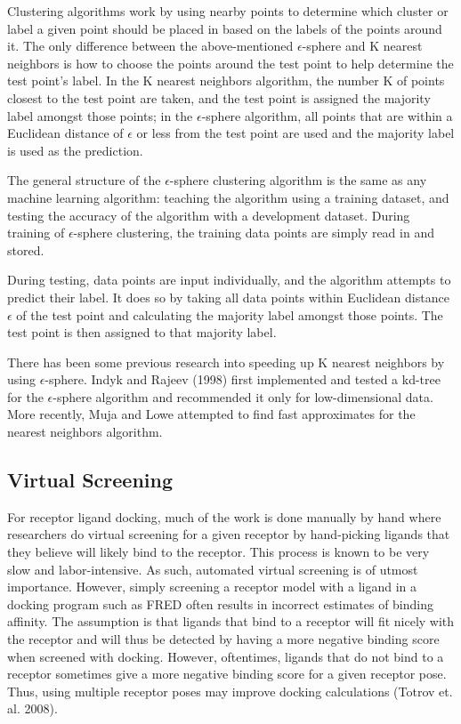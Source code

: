 \documentclass[11pt,letterpaper]{article}
\begin{document}
Clustering algorithms work by using nearby points to determine which cluster or label a given point should be placed in based on the labels of the points around it. The only difference between the above-mentioned $\epsilon$-sphere and K nearest neighbors is how to choose the points around the test point to help determine the test point's label. In the K nearest neighbors algorithm, the number K of points closest to the test point are taken, and the test point is assigned the majority label amongst those points; in the $\epsilon$-sphere algorithm, all points that are within a Euclidean distance of $\epsilon$ or less from the test point are used and the majority label is used as the prediction.

The general structure of the $\epsilon$-sphere clustering algorithm is the same as any machine learning algorithm: teaching the algorithm using a training dataset, and testing the accuracy of the algorithm with a development dataset. During training of $\epsilon$-sphere clustering, the training data points are simply read in and stored. 

During testing, data points are input individually, and the algorithm attempts to predict their label. It does so by taking all data points within Euclidean distance $\epsilon$ of the test point and calculating the majority label amongst those points. The test point is then assigned to that majority label.

There has been some previous research into speeding up K nearest neighbors by using $\epsilon$-sphere. Indyk and Rajeev (1998) first implemented and tested a kd-tree for the $\epsilon$-sphere algorithm and recommended it only for low-dimensional data. More recently, Muja and Lowe attempted to find fast approximates for the nearest neighbors algorithm.

\subsection{Virtual Screening}
For receptor ligand docking, much of the work is done manually by hand where researchers do virtual screening for a given receptor by hand-picking ligands that they believe will likely bind to the receptor.  This process is known to be very slow and labor-intensive.  As such, automated virtual screening is of utmost importance.  However, simply screening a receptor model with a ligand in a docking program such as FRED often results in incorrect estimates of binding affinity.  The assumption is that ligands that bind to a receptor will fit nicely with the receptor and will thus be detected by having a more negative binding score when screened with docking.  However, oftentimes, ligands that do not bind to a receptor sometimes give a more negative binding score for a given receptor pose. Thus, using multiple receptor poses may improve docking calculations (Totrov et. al. 2008).
\end{document}
